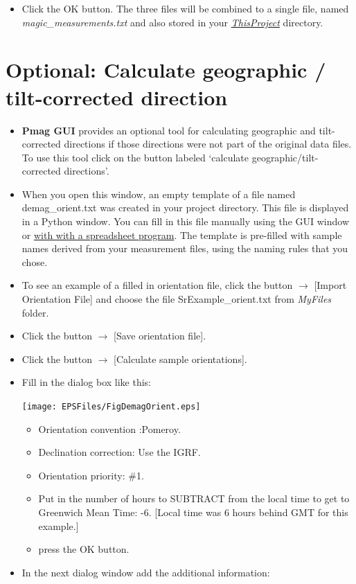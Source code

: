 \documentclass[11pt]{book}
\begin{document}
{\begin{itemize}
\texttt{[image: EPSFiles/FigCombineMagic.eps]}

\item Click the OK button. The three files will be combined to a single file,  named {\it magic\_measurements.txt} and also stored  in your \href{#Project_Directory}{\it ThisProject} directory.
\end{itemize}


\section{Optional: Calculate geographic / tilt-corrected direction}
\begin{itemize}
\item {\bf Pmag GUI} provides an optional tool for calculating geographic and tilt-corrected directions if those directions were not part of the original data files. To use this tool click on the button labeled `calculate geographic/tilt-corrected directions'.

\item When you open this window, an empty template of a file named demag\_orient.txt was created in your project directory. This file is displayed in a Python window. You can fill in  this file manually using the GUI window or \href{#field_info}{with with a spreadsheet program}. The template is pre-filled with sample names derived from your measurement files, using the naming rules that you chose.
\item To see an example of a filled in orientation file, click the button $\rightarrow$ [Import Orientation File] and  choose the file SrExample\_orient.txt from {\it MyFiles} folder.
\item Click the button $\rightarrow$ [Save orientation file].
\item Click the button $\rightarrow$ [Calculate sample orientations].
\item Fill in the dialog box like this:

\texttt{[image: EPSFiles/FigDemagOrient.eps]}

\begin{itemize}
\item Orientation convention :Pomeroy.
\item Declination correction: Use the IGRF.
\item  Orientation priority: \#1.
\item Put in the number of hours to SUBTRACT from the local time to get to Greenwich Mean Time: -6. [Local time was 6 hours behind GMT for this example.]
\item press the OK button.
\end{itemize}
\item In the next dialog window add the additional information:
\end{itemize}

}
\end{document}

